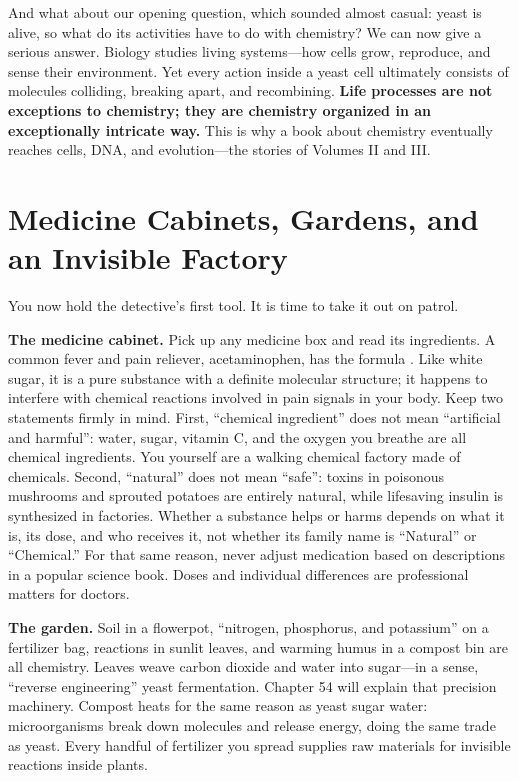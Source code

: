 And what about our opening question, which sounded almost casual: yeast is alive, so what do its activities have to do with chemistry? We can now give a serious answer. Biology studies living systems---how cells grow, reproduce, and sense their environment. Yet every action inside a yeast cell ultimately consists of molecules colliding, breaking apart, and recombining. \textbf{Life processes are not exceptions to chemistry; they are chemistry organized in an exceptionally intricate way.} This is why a book about chemistry eventually reaches cells, DNA, and evolution---the stories of Volumes II and III.

\section{Medicine Cabinets, Gardens, and an Invisible Factory}

You now hold the detective's first tool. It is time to take it out on patrol.

\textbf{The medicine cabinet.} Pick up any medicine box and read its ingredients. A common fever and pain reliever, acetaminophen, has the formula . Like white sugar, it is a pure substance with a definite molecular structure; it happens to interfere with chemical reactions involved in pain signals in your body. Keep two statements firmly in mind. First, ``chemical ingredient'' does not mean ``artificial and harmful'': water, sugar, vitamin C, and the oxygen you breathe are all chemical ingredients. You yourself are a walking chemical factory made of chemicals. Second, ``natural'' does not mean ``safe'': toxins in poisonous mushrooms and sprouted potatoes are entirely natural, while lifesaving insulin is synthesized in factories. Whether a substance helps or harms depends on what it is, its dose, and who receives it, not whether its family name is ``Natural'' or ``Chemical.'' For that same reason, never adjust medication based on descriptions in a popular science book. Doses and individual differences are professional matters for doctors.

\textbf{The garden.} Soil in a flowerpot, ``nitrogen, phosphorus, and potassium'' on a fertilizer bag, reactions in sunlit leaves, and warming humus in a compost bin are all chemistry. Leaves weave carbon dioxide and water into sugar---in a sense, ``reverse engineering'' yeast fermentation. Chapter 54 will explain that precision machinery. Compost heats for the same reason as yeast sugar water: microorganisms break down molecules and release energy, doing the same trade as yeast. Every handful of fertilizer you spread supplies raw materials for invisible reactions inside plants.

